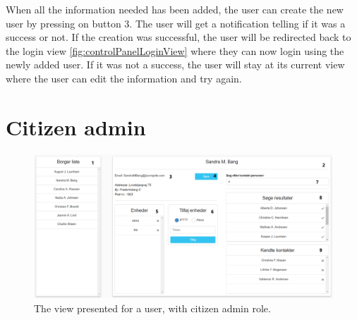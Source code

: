 When all the information needed has been added, the user can create the new user by pressing on button 3. The user will get a notification telling if it was a success or not. If the creation was successful, the user will be redirected back to the login view \ref{fig:controlPanelLoginView} where they can now login using the newly added user. If it was not a success, the user will stay at its current view where the user can edit the information and try again.


\section{Citizen admin}
\begin{figure}[H]
    \centering
    \includegraphics[scale=0.3]{Figures/ControlPanel/CitizenAdminView.png}
    \caption{The view presented for a user, with citizen admin role.}
    \label{fig:controlPanelCitizenAdminView}
\end{figure}

